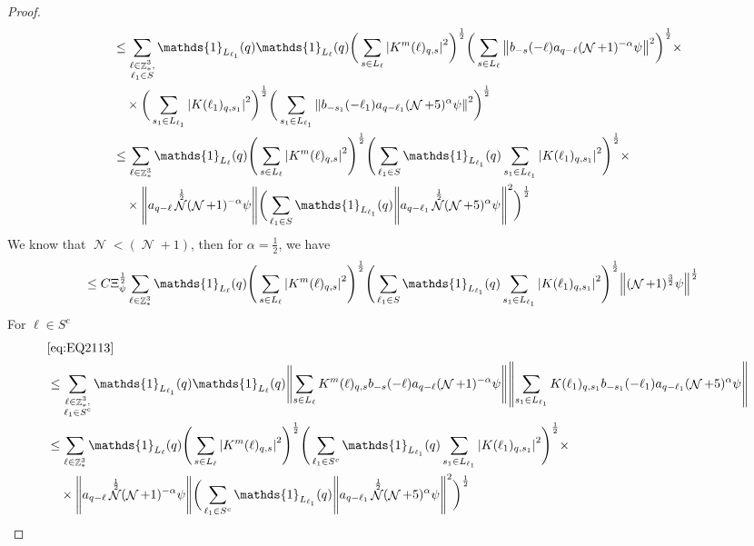 \documentclass[12pt,a4paper]{article}
\numberwithin{equation}{section}
\newcommand{\1}{\mathbb{I}}
\DeclareMathOperator{\Z}{\mathbb{Z}}
\DeclareMathOperator{\NN}{\mathcal{N}}
\newcommand{\half}{\frac{1}{2}}
\theoremstyle{plain}
\theoremstyle{definition}
\theoremstyle{remark}
\theoremstyle{plain}
\theoremstyle{definition}
\theoremstyle{remark}
\begin{document}
\begin{proof}
\begin{align}
		&\leq\sum\limits_{\substack{\ell\in \Z^3_*,\\ \ell_1\in S}} \mathds{1}_{L_{\ell_1}}(q) \mathds{1}_{L_{\ell}}(q)  \bigg(\sum\limits_{s\in L_{\ell}}\abs{  K^m(\ell)_{q,s}}^2 \bigg)^\half \bigg(\sum\limits_{s\in L_{\ell}}\norm{   b_{-s}(-\ell) a_{q-\ell}(\NN+1)^{-\alpha}\psi}^2\bigg)^\half \times \\ &\quad \times\bigg(\sum\limits_{s_1\in L_{\ell_1}}\abs{  K(\ell_1)_{q,s_1}}^2 \bigg)^\half \bigg(\sum\limits_{s_1 \in L_{\ell_1}}\norm{ b_{-s_1}(-\ell_1)a_{q-\ell_1} (\NN+5)^{\alpha} \psi }^2\bigg)^\half\nonumber\\
		&\leq\sum\limits_{\ell\in \Z^3_*}  \mathds{1}_{L_{\ell}}(q) \Bigg(\sum\limits_{s \in L_{\ell}} \abs{K^m(\ell)_{q,s}}^2\Bigg)^\half \Bigg(\sum\limits_{ \ell_1\in S} \mathds{1}_{L_{\ell_1}}(q)\sum\limits_{s_1 \in L_{\ell_1}} \abs{K(\ell_1)_{q,s_1}}^2\Bigg)^\half \times \\ &\quad\times \norm{ a_{q-\ell} \NN^\half (\NN+1)^{-\alpha}\psi} \bigg(\sum\limits_{ \ell_1\in S} \mathds{1}_{L_{\ell_1}}(q) \norm{ a_{q-\ell_1} \NN^\half (\NN+5)^{\alpha} \psi }^2\bigg)^\half\nonumber\\
	\end{align}
	We know that $\NN<(\NN+1)$, then for $\alpha = \half$, we have
	\begin{align}
		&\leq C \Xi_{\psi}^\half \sum\limits_{\ell\in \Z^3_*}  \mathds{1}_{L_{\ell}}(q) \Bigg(\sum\limits_{s \in L_{\ell}} \abs{K^m(\ell)_{q,s}}^2\Bigg)^\half \Bigg(\sum\limits_{ \ell_1\in S} \mathds{1}_{L_{\ell_1}}(q)\sum\limits_{s_1 \in L_{\ell_1}} \abs{K(\ell_1)_{q,s_1}}^2\Bigg)^\half\norm{ (\NN+1)^{\frac{3}{2}}\psi}^\half  \label{eq:estEQ2113}
	\end{align}
	For $\ell \in S^c$
	\begin{align}
		&\eqref{eq:EQ2113}\nonumber\\
		&\leq\sum\limits_{\substack{\ell\in \Z^3_*,\\ \ell_1\in S^c}} \mathds{1}_{L_{\ell_1}}(q) \mathds{1}_{L_{\ell}}(q)  \norm{ \sum\limits_{s\in L_{\ell}} K^m(\ell)_{q,s} b_{-s}(-\ell) a_{q-\ell}(\NN+1)^{-\alpha}\psi}\norm{ \sum\limits_{s_1 \in L_{\ell_1}} K(\ell_1)_{q,s_1} b_{-s_1}(-\ell_1)a_{q-\ell_1} (\NN+5)^{\alpha} \psi }\nonumber\\
		&\leq\sum\limits_{\ell\in \Z^3_*}  \mathds{1}_{L_{\ell}}(q) \Bigg(\sum\limits_{s \in L_{\ell}} \abs{K^m(\ell)_{q,s}}^2\Bigg)^\half \Bigg(\sum\limits_{ \ell_1\in S^c} \mathds{1}_{L_{\ell_1}}(q)\sum\limits_{s_1 \in L_{\ell_1}} \abs{K(\ell_1)_{q,s_1}}^2\Bigg)^\half \times \\ &\quad\times \norm{ a_{q-\ell} \NN^\half (\NN+1)^{-\alpha}\psi} \bigg(\sum\limits_{ \ell_1\in S^c} \mathds{1}_{L_{\ell_1}}(q) \norm{ a_{q-\ell_1} \NN^\half (\NN+5)^{\alpha} \psi }^2\bigg)^\half\nonumber\\

\end{align}
\end{proof}
\end{document}
